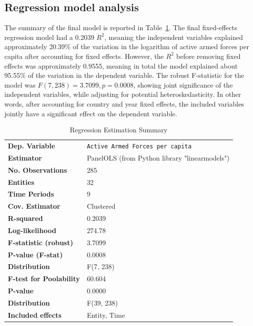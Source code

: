 \subsection{Regression model analysis}

The summary of the final model is reported in Table~\ref{tab:model_summary}.
The final fixed-effects regression model had a 0.2039 $R^2$, meaning the independent variables explained approximately 20.39\% of the variation in the logarithm of active armed forces per capita after accounting for fixed effects. 
However, the $R^2$ before removing fixed effects was approximately 0.9555, meaning in total the model explained about 95.55\% of the variation in the dependent variable.
The robust F-statistic for the model was $F(7, 238)=3.7099, p=0.0008$, showing joint significance of the independent variables, while adjusting for potential heteroskedasticity.
In other words, after accounting for country and year fixed effects, the included variables jointly have a significant effect on the dependent variable.

\renewcommand{\arraystretch}{1.3}

\begin{table}[htbp]
\caption{Regression Estimation Summary}
\centering
\begin{threeparttable}
\begin{tabularx}{\textwidth}{@{}lX@{}}
\toprule
\textbf{Dep. Variable} & \texttt{Active Armed Forces per capita} \\
\textbf{Estimator} & PanelOLS (from Python library "linearmodels") \\
\textbf{No. Observations} & 285 \\
\textbf{Entities} & 32 \\
\textbf{Time Periods} & 9 \\
\textbf{Cov. Estimator} & Clustered \\
\midrule
\textbf{R-squared} & 0.2039 \\
\textbf{Log-likelihood} & 274.78 \\
\textbf{F-statistic (robust)} & 3.7099 \\
\textbf{P-value (F-stat)} & 0.0008 \\
\textbf{Distribution} & F(7, 238) \\
\midrule
\textbf{F-test for Poolability} & 60.604 \\
\textbf{P-value} & 0.0000 \\
\textbf{Distribution} & F(39, 238) \\
\textbf{Included effects} & Entity, Time \\
\bottomrule
\end{tabularx}
\end{threeparttable}
\label{tab:model_summary}
\end{table} 

